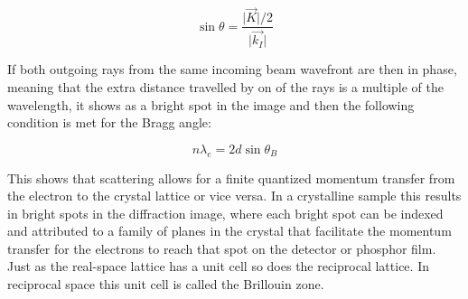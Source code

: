 \begin{equation}
    \sin{\theta}=\frac{\vert \vec{K}\vert / 2}{\vert \vec{k_I}\vert}
    \label{eq:bragg_angle}
\end{equation}

If both outgoing rays from the same incoming beam wavefront are then in phase, meaning that the extra distance travelled by on of the rays is a multiple of the wavelength, it shows as a bright spot in the image and then the following condition is met for the Bragg angle:

\begin{equation}
    n \lambda_e = 2 d \sin{\theta_B}
    \label{eq:bragg_angle_ser}
\end{equation}

This shows that scattering allows for a finite quantized momentum transfer from the electron to the crystal lattice or vice versa. In a crystalline sample this results in bright spots in the diffraction image, where each bright spot can be indexed and attributed to a family of planes in the crystal that facilitate the momentum transfer for the electrons to reach that spot on the detector or phosphor film.
Just as the real-space lattice has a unit cell so does the reciprocal lattice. In reciprocal space this unit cell is called the Brillouin zone.



